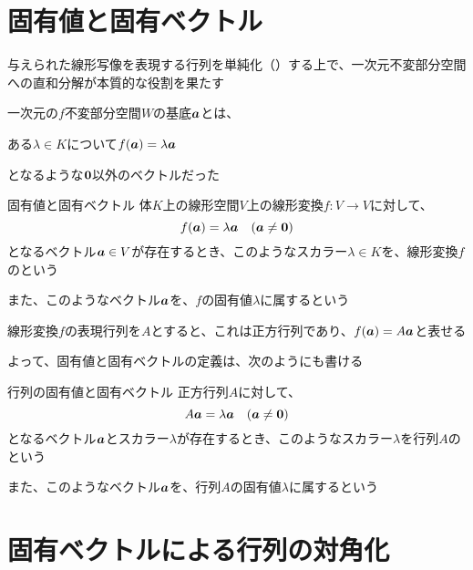 \documentclass[../../../topic_linear-algebra]{subfiles}
\begin{document}
\sectionline
\section{固有値と固有ベクトル}

与えられた線形写像を表現する行列を単純化（）する上で、一次元不変部分空間への直和分解が本質的な役割を果たす

\br

一次元の$f$不変部分空間$W$の基底$\vb*{a}$とは、
\begin{shaded}
  ある$\lambda \in K$について$f(\vb*{a}) = \lambda \vb*{a}$
\end{shaded}
となるような$\vb*{0}$以外のベクトルだった

\begin{definition}{固有値と固有ベクトル}
  体$K$上の線形空間$V$上の線形変換$f\colon V \to V$に対して、
  \begin{equation*}
    f(\vb*{a}) = \lambda \vb*{a} \quad (\vb*{a} \neq \vb*{0})
  \end{equation*}
  となるベクトル$\vb*{a} \in V$が存在するとき、このようなスカラー$\lambda \in K$を、線形変換$f$のという

  また、このようなベクトル$\vb*{a}$を、$f$の固有値$\lambda$に属するという
\end{definition}

線形変換$f$の表現行列を$A$とすると、これは正方行列であり、$f(\vb*{a}) = A\vb*{a}$と表せる

よって、固有値と固有ベクトルの定義は、次のようにも書ける

\begin{definition}{行列の固有値と固有ベクトル}
  正方行列$A$に対して、
  \begin{equation*}
    A\vb*{a} = \lambda \vb*{a} \quad (\vb*{a} \neq \vb*{0})
  \end{equation*}
  となるベクトル$\vb*{a}$とスカラー$\lambda$が存在するとき、このようなスカラー$\lambda$を行列$A$のという

  また、このようなベクトル$\vb*{a}$を、行列$A$の固有値$\lambda$に属するという
\end{definition}

\sectionline
\section{固有ベクトルによる行列の対角化}
\end{document}
